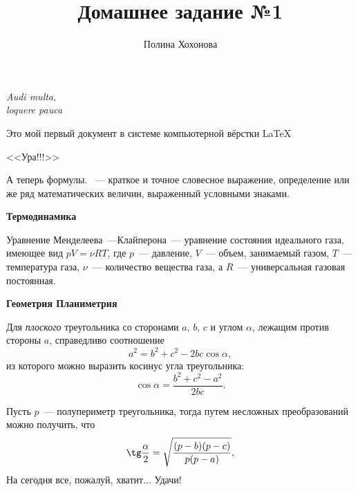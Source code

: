 \documentclass[12pt]{article}
\title{Домашнее задание №1}
\author{Полина Хохонова}
\date{}
\begin{document}
 
   \maketitle 
   \begin{flushright} 
   {\itshape Audi multa,\\ loquere pauca} 
   \end{flushright} 
   \hspace{20 pt} 
   \begin{center} 
     Это мой первый документ в системе компьютерной вёрстки \LaTeX
   \end{center}
   \begin{center}
   \large \sffamily <<Ура!!!>> 
    \end{center}
    А теперь формулы. {}~--- краткое и точное словесное выражение, определение или же ряд математических величин, выраженный условными знаками.
    
    \vspace{28 pt}
    \hspace{15 pt} 
    \large \textbf{Термодинамика} 
    
    Уравнение Менделеева~---Клайперона~--- уравнение состояния идеального газа, имеющее вид $pV = \nu RT$, где $p$~--- давление, $V$~--- объем, занимаемый газом, $T$~--- температура газа, $\nu$~--- количество вещества газа, а $R$~--- универсальная газовая постоянная.
    
    \vspace{28 pt}
    \hspace{15 pt}
    \large \textbf{Геометрия  \hfill Планиметрия}
    
    Для \textit{плоского} треугольника со сторонами $a$, $b$, $c$ и углом $\alpha$, лежащим против стороны $a$, справедливо соотношение \[a^2 = b^2 + c^2 - 2bc\cos\alpha,\] из которого можно выразить косинус угла треугольника: \[\cos\alpha = \frac{b^2 + c^2 - a^2}{2bc}.\]
    
    
    Пусть $p$~--- полупериметр треугольника, тогда путем несложных преобразований можно получить, что \[\tg\frac{\alpha}{2}= \sqrt{\frac{(p - b)(p - c)}{p(p - a)}},\] На сегодня все, пожалуй, хватит... Удачи!
\end{document}
